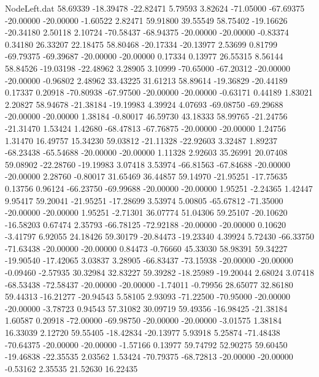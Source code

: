 \begin{filecontents}{NodeLeft.dat}
  58.69339  -18.39478  -22.82471     5.79593    3.82624  -71.05000  -67.69375  -20.00000  -20.00000   -1.60522    2.82471   59.91800   39.55549
  58.75402  -19.16626  -20.34180     2.50118    2.10724  -70.58437  -68.94375  -20.00000  -20.00000   -0.83374    0.34180   26.33207   22.18475
  58.80468  -20.17334  -20.13977     2.53699    0.81799  -69.79375  -69.39687  -20.00000  -20.00000    0.17334    0.13977   26.55315    8.56144
  58.84526  -19.03198  -22.48962     3.28905    3.10999  -70.65000  -67.20312  -20.00000  -20.00000   -0.96802    2.48962   33.43225   31.61213
  58.89614  -19.36829  -20.44189     0.17337    0.20918  -70.80938  -67.97500  -20.00000  -20.00000   -0.63171    0.44189    1.83021    2.20827
  58.94678  -21.38184  -19.19983     4.39924    4.07693  -69.08750  -69.29688  -20.00000  -20.00000    1.38184   -0.80017   46.59730   43.18333
  58.99765  -21.24756  -21.31470     1.53424    1.42680  -68.47813  -67.76875  -20.00000  -20.00000    1.24756    1.31470   16.49757   15.34230
  59.03812  -21.11328  -22.92603     3.32487    1.89237  -68.23438  -65.54688  -20.00000  -20.00000    1.11328    2.92603   35.26991   20.07408
  59.08902  -22.28760  -19.19983     3.07418    3.53974  -66.81563  -67.84688  -20.00000  -20.00000    2.28760   -0.80017   31.65469   36.44857
  59.14970  -21.95251  -17.75635     0.13756    0.96124  -66.23750  -69.99688  -20.00000  -20.00000    1.95251   -2.24365    1.42447    9.95417
  59.20041  -21.95251  -17.28699     3.53974    5.00805  -65.67812  -71.35000  -20.00000  -20.00000    1.95251   -2.71301   36.07774   51.04306
  59.25107  -20.10620  -16.58203     0.67474    2.35793  -66.78125  -72.92188  -20.00000  -20.00000    0.10620   -3.41797    6.92055   24.18426
  59.30179  -20.84473  -19.23340     4.39924    5.72430  -66.33750  -71.63438  -20.00000  -20.00000    0.84473   -0.76660   45.33030   58.98391
  59.34227  -19.90540  -17.42065     3.03837    3.28905  -66.83437  -73.15938  -20.00000  -20.00000   -0.09460   -2.57935   30.32984   32.83227
  59.39282  -18.25989  -19.20044     2.68024    3.07418  -68.53438  -72.58437  -20.00000  -20.00000   -1.74011   -0.79956   28.65077   32.86180
  59.44313  -16.21277  -20.94543     5.58105    2.93093  -71.22500  -70.95000  -20.00000  -20.00000   -3.78723    0.94543   57.31082   30.09719
  59.49356  -16.98425  -21.38184     1.60587    0.20918  -72.00000  -69.98750  -20.00000  -20.00000   -3.01575    1.38184   16.33039    2.12720
  59.55405  -18.42834  -20.13977     5.93918    5.25874  -71.48438  -70.64375  -20.00000  -20.00000   -1.57166    0.13977   59.74792   52.90275
  59.60450  -19.46838  -22.35535     2.03562    1.53424  -70.79375  -68.72813  -20.00000  -20.00000   -0.53162    2.35535   21.52630   16.22435

\end{filecontents}
